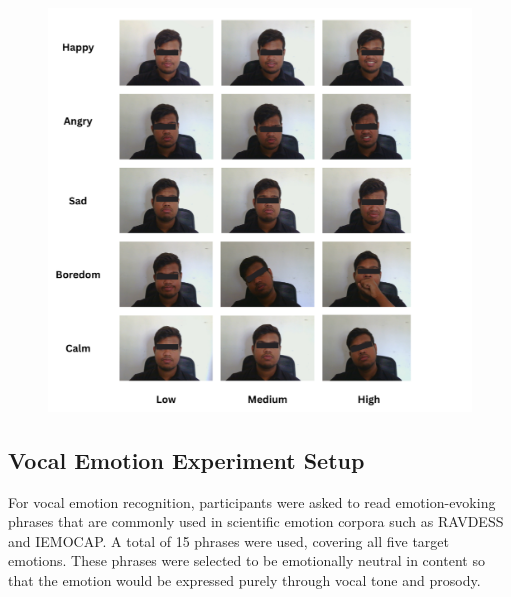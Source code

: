 \begin{figure}[h]
    \centering
    \includegraphics[width=1\textwidth]{img/chapter_03/facial_expr_experiment.png}
    \label{fig:facial_expr_experiment}
\end{figure}


\subsection{Vocal Emotion Experiment Setup}

For vocal emotion recognition, participants were asked to read emotion-evoking phrases that are commonly used in scientific emotion corpora such as RAVDESS and IEMOCAP. A total of 15 phrases were used, covering all five target emotions. These phrases were selected to be emotionally neutral in content so that the emotion would be expressed purely through vocal tone and prosody.

